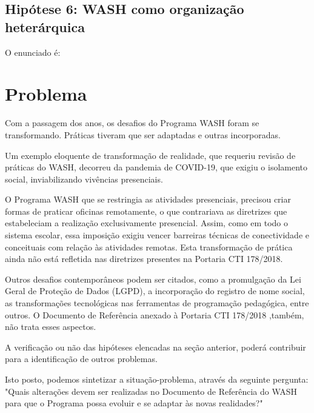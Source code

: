 \subsection[Hipótese 6: WASH como organização heterárquica]{Hipótese 6: WASH como organização heterárquica}\label{Hipótese 6: WASH como organização heterárquica}
O enunciado é:


\noindent\begin{flushright}\mbox{\linespread{1}\selectfont\centering{}}\end{flushright}


\section[Problema]{Problema}\label{Problema}
Com a passagem dos anos, os desafios do Programa WASH foram se transformando. Práticas tiveram que ser adaptadas e outras incorporadas.

Um exemplo eloquente de transformação de realidade, que requeriu revisão de práticas do WASH, decorreu da pandemia de COVID-19, que exigiu o isolamento social, inviabilizando vivências presenciais.

O Programa WASH que se restringia as atividades presenciais, precisou criar formas de praticar oficinas remotamente, o que contrariava as diretrizes que estabeleciam a realização exclusivamente presencial. Assim, como em todo o sistema escolar, essa imposição exigiu vencer barreiras técnicas de conectividade e conceituais com relação às atividades remotas. Esta transformação de prática ainda não está refletida nas diretrizes presentes na Portaria CTI 178/2018.

Outros desafios contemporâneos podem ser citados, como a promulgação da Lei Geral de Proteção de Dados (LGPD), a incorporação do registro de nome social, as transformações tecnológicas nas ferramentas de programação pedagógica, entre outros. O Documento de Referência anexado à Portaria CTI 178/2018 ,também, não trata esses aspectos.

A verificação ou não das hipóteses elencadas na seção anterior, poderá contribuir para a identificação de outros problemas.

Isto posto, podemos sintetizar a situação-problema, através da seguinte pergunta: "Quais alterações devem ser realizadas no Documento de Referência do WASH para que o Programa possa evoluir e se adaptar às novas realidades?"

